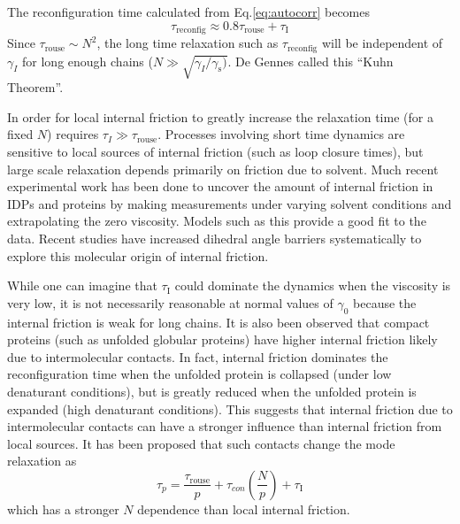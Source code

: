 \documentclass[../talant.diss.submit.tex]{subfiles}
\begin{document}
The reconfiguration time calculated from Eq.\ref{eq:autocorr} becomes
\begin{equation}
  \label{eq:reconf_if}
  \tau_\mathrm{reconfig} \approx 0.8\tau_\mathrm{rouse} + \tau_\mathrm{I}
\end{equation}
Since $\tau_\mathrm{rouse} \sim N^2$, the long time relaxation such as
$\tau_\mathrm{reconfig}$ will be independent of $\gamma_I$ for long enough chains
($N \gg \sqrt{\gamma_I/\gamma_\mathrm{s})}$.
De Gennes called this ``Kuhn
Theorem''.\cite{Gennes:1979}

In order for local internal friction to greatly increase
the relaxation time (for a fixed $N$) requires $\tau_I \gg \tau_\mathrm{rouse}$.
Processes involving short time
dynamics are sensitive to local sources of internal friction (such as loop
closure times\cite{portman:03,weikl:08}), but large scale relaxation depends
primarily on friction due to solvent.  Much recent experimental work has been
done to uncover the amount of internal friction in IDPs and proteins by making
measurements under varying solvent conditions and extrapolating the zero
viscosity.\cite{soranno:12,Schuler:2016} Models such as this provide a good fit to
the data.\cite{cheng:13,Samanta:2014,Samanta:2016,Zheng:2018b} Recent studies %
have increased dihedral angle barriers systematically to explore this molecular origin
of internal friction.\cite{echeverria:14,Zheng:2018b}

While one can imagine that $\tau_{\mathrm{I}}$ could dominate the dynamics when
the viscosity is very low, it is not necessarily reasonable at normal values of
$\gamma_0$ because the internal friction is weak for long chains.  It is also
been observed that compact proteins (such as unfolded globular proteins) have
higher internal friction likely due to intermolecular
contacts.\cite{soranno:12,Schuler:2016,Zheng:2018b} In fact, internal friction
dominates the reconfiguration time when the unfolded protein is collapsed (under
low denaturant conditions), but is greatly reduced when the unfolded protein is
expanded (high denaturant conditions).\cite{Schuler:2016} This suggests that
internal friction due to intermolecular contacts can have a stronger influence
than internal friction from local sources.\cite{sorano:2017a} It has been
proposed that such contacts change the mode relaxation as
\begin{equation}
  \label{eq:mode_if2}
  \tau_p = \frac{\tau_\mathrm{rouse}}{p} + \tau_{con}\left(\frac{N}{p}\right) + \tau_\mathrm{I}
\end{equation}
which has a stronger $N$ dependence than local internal friction.\cite{Soranno:2018}
\end{document}
